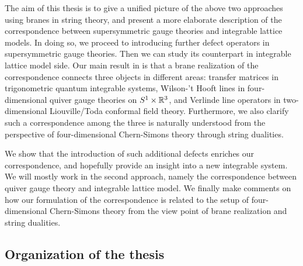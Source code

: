 The aim of this thesis is to give a unified picture of the above two approaches
using branes in string theory,
and present a more elaborate description of the correspondence between
supersymmetric gauge theories and integrable lattice models.
In doing so, we proceed to introducing further defect operators in
supersymmetric gauge theories. Then we can study its counterpart in integrable
lattice model side.
Our main result in \cite{Maruyoshi:2020cwy} is that a brane realization of the correspondence connects
three objects in different areas:
transfer matrices in trigonometric quantum integrable systems,
Wilson-'t Hooft lines in four-dimensional quiver gauge theories on $S^1\times \mathbb{R}^3$, and
Verlinde line operators in two-dimensional Liouville/Toda conformal field theory.
Furthermore, we also clarify such a correspondence among the three is naturally understood
from the perspective of four-dimensional Chern-Simons theory through string dualities.


We show that the introduction of such additional defects enriches our correspondence,
and hopefully provide an insight into a new integrable system.
We will mostly work in the second approach, namely the correspondence between
quiver gauge theory and integrable lattice model.
We finally make comments on how our formulation of the correspondence is related to the setup of
four-dimensional Chern-Simons theory
from the view point of brane realization and string dualities.







\subsection*{Organization of the thesis}


